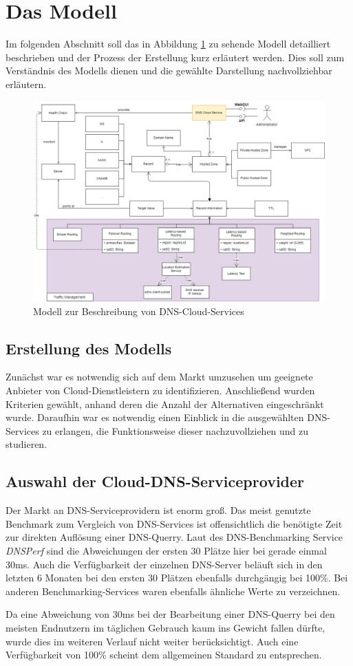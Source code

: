 \section{Das Modell}
Im folgenden Abschnitt soll das in Abbildung \ref{fig:ccmodel} zu sehende Modell detailliert beschrieben und der Prozess der Erstellung kurz erläutert werden. Dies soll zum Verständnis des Modells dienen und die gewählte Darstellung nachvollziehbar erläutern.

\begin{figure}
    \includegraphics[width=\textwidth]{images/cc_modelxml.png}
    \caption{Modell zur Beschreibung von DNS-Cloud-Services}
    \label{fig:ccmodel}
\end{figure}

\subsection{Erstellung des Modells}
Zunächst war es notwendig sich auf dem Markt umzusehen um geeignete Anbieter von Cloud-Dienstleistern zu identifizieren. Anschließend wurden Kriterien gewählt, anhand deren die Anzahl der Alternativen eingeschränkt wurde. Daraufhin war es notwendig einen Einblick in die ausgewählten DNS-Services zu erlangen, die Funktionsweise dieser nachzuvollziehen und zu studieren. 

\subsection{Auswahl der Cloud-DNS-Serviceprovider}
Der Markt an DNS-Serviceprovidern ist enorm groß. Das meist genutzte Benchmark zum Vergleich von DNS-Services ist offensichtlich die benötigte Zeit zur direkten Auflösung einer DNS-Querry. Laut des DNS-Benchmarking Service \textit{DNSPerf} sind die Abweichungen der ersten 30 Plätze hier bei gerade einmal 30ms. Auch die Verfügbarkeit der einzelnen DNS-Server beläuft sich in den letzten 6 Monaten bei den ersten 30 Plätzen ebenfalls durchgängig bei 100\%. Bei anderen Benchmarking-Services waren ebenfalls ähnliche Werte zu verzeichnen.

Da eine Abweichung von 30ms bei der Bearbeitung einer DNS-Querry bei den meisten Endnutzern im täglichen Gebrauch kaum ins Gewicht fallen dürfte, wurde dies im weiteren Verlauf nicht weiter berücksichtigt. Auch eine Verfügbarkeit von 100\% scheint dem allgemeinen Standard zu entsprechen.